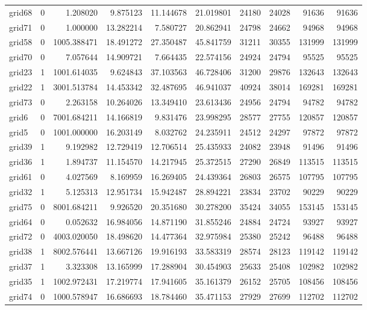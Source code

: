 \begin{longtable}{|l|r|r|r|r|r|r|r|r|r|}
grid68 & 0 & 1.208020 & 9.875123 & 11.144678 & 21.019801 & 24180 & 24028 & 91636 & 91636 \\
grid71 & 0 & 1.000000 & 13.282214 & 7.580727 & 20.862941 & 24798 & 24662 & 94968 & 94968 \\
grid58 & 0 & 1005.388471 & 18.491272 & 27.350487 & 45.841759 & 31211 & 30355 & 131999 & 131999 \\
grid70 & 0 & 7.057644 & 14.909721 & 7.664435 & 22.574156 & 24924 & 24794 & 95525 & 95525 \\
grid23 & 1 & 1001.614035 & 9.624843 & 37.103563 & 46.728406 & 31200 & 29876 & 132643 & 132643 \\
grid22 & 1 & 3001.513784 & 14.453342 & 32.487695 & 46.941037 & 40924 & 38014 & 169281 & 169281 \\
grid73 & 0 & 2.263158 & 10.264026 & 13.349410 & 23.613436 & 24956 & 24794 & 94782 & 94782 \\
grid6 & 0 & 7001.684211 & 14.166819 & 9.831476 & 23.998295 & 28577 & 27755 & 120857 & 120857 \\
grid5 & 0 & 1001.000000 & 16.203149 & 8.032762 & 24.235911 & 24512 & 24297 & 97872 & 97872 \\
grid39 & 1 & 9.192982 & 12.729419 & 12.706514 & 25.435933 & 24082 & 23948 & 91496 & 91496 \\
grid36 & 1 & 1.894737 & 11.154570 & 14.217945 & 25.372515 & 27290 & 26849 & 113515 & 113515 \\
grid61 & 0 & 4.027569 & 8.169959 & 16.269405 & 24.439364 & 26803 & 26575 & 107795 & 107795 \\
grid32 & 1 & 5.125313 & 12.951734 & 15.942487 & 28.894221 & 23834 & 23702 & 90229 & 90229 \\
grid75 & 0 & 8001.684211 & 9.926520 & 20.351680 & 30.278200 & 35424 & 34055 & 153145 & 153145 \\
grid64 & 0 & 0.052632 & 16.984056 & 14.871190 & 31.855246 & 24884 & 24724 & 93927 & 93927 \\
grid72 & 0 & 4003.020050 & 18.498620 & 14.477364 & 32.975984 & 25380 & 25242 & 96488 & 96488 \\
grid38 & 1 & 8002.576441 & 13.667126 & 19.916193 & 33.583319 & 28574 & 28123 & 119142 & 119142 \\
grid37 & 1 & 3.323308 & 13.165999 & 17.288904 & 30.454903 & 25633 & 25408 & 102982 & 102982 \\
grid35 & 1 & 1002.972431 & 17.219774 & 17.941605 & 35.161379 & 26152 & 25705 & 108456 & 108456 \\
grid74 & 0 & 1000.578947 & 16.686693 & 18.784460 & 35.471153 & 27929 & 27699 & 112702 & 112702 \\

\end{longtable}
